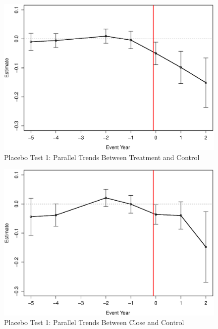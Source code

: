 \documentclass[10pt,letterpaper,subeqn]{beamer}
\begin{document}
\begin{frame}[label=empirA4]
\begin{figure}
\begin{center}
\caption{Placebo Test 1: Parallel Trends Between Treatment and Control}
\includegraphics[scale=0.45]{./figures/Event1519treat.eps}
\end{center}
\end{figure}
\end{frame}

\begin{frame}[label=empirA5]
\begin{figure}
\begin{center}
\caption{Placebo Test 1: Parallel Trends Between Close and Control}
\includegraphics[scale=0.45]{./figures/Event1519close.eps}
\end{center}
\end{figure}
\end{frame}
\end{document}
